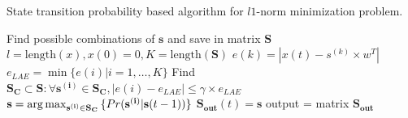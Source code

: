\begin{algorithm}
\caption{State transition probability based algorithm for $l1$-norm minimization problem.}\label{algoL3}
\begin{algorithmic}[1]
\State Find possible combinations of $\mathbf{s}$ and save in matrix $\mathbf{S}$
\State $l = \text{length}(x),x(0) = 0,K=\text{length}(\mathbf{S})$
	        \State $e(k) = |x(t)-s^{(k)}\times w^T|$
	    \EndFor
		\State $e_{LAE} = \min{\{e(i)|i=1,\ldots,K\}}$
		\State Find $\mathbf{S_C}\subset \mathbf{S}: \forall \mathbf{s^{(i)}}\in \mathbf{S_C},|e(i)-e_{LAE}|\leq \gamma \times e_{LAE}$
		\State $\mathbf{s} = \operatorname*{arg\,max}_{\mathbf{s^{(i)}}\in \mathbf{S_C}}{\{Pr(\mathbf{s^{(i)}}|\mathbf{s}(t-1))\}}$
		\State $\mathbf{S_{out}}(t) = \mathbf{s}$
	\EndFor
\State output = matrix $\mathbf{S_{out}}$
\EndFunction
\end{algorithmic}
\end{algorithm}




